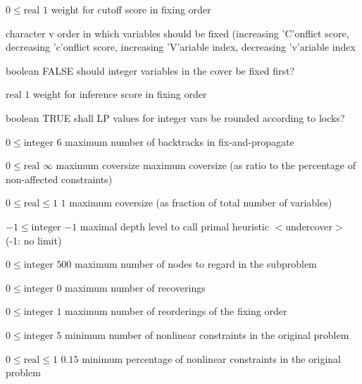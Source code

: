 %
{$0\leq\textrm{real}$}%
{$1$}%
{weight for cutoff score in fixing order}%
{}

%
{character}%
{v}%
{order in which variables should be fixed (increasing 'C'onflict score, decreasing 'c'onflict score, increasing 'V'ariable index, decreasing 'v'ariable index}%
{}

%
{boolean}%
{FALSE}%
{should integer variables in the cover be fixed first?}%
{}

%
{$\textrm{real}$}%
{$1$}%
{weight for inference score in fixing order}%
{}

%
{boolean}%
{TRUE}%
{shall LP values for integer vars be rounded according to locks?}%
{}

%
{$0\leq\textrm{integer}$}%
{$6$}%
{maximum number of backtracks in fix-and-propagate}%
{}

%
{$0\leq\textrm{real}$}%
{$\infty$}%
{maximum coversize maximum coversize (as ratio to the percentage of non-affected constraints)}%
{}

%
{$0\leq\textrm{real}\leq1$}%
{$1$}%
{maximum coversize (as fraction of total number of variables)}%
{}

%
{$-1\leq\textrm{integer}$}%
{$-1$}%
{maximal depth level to call primal heuristic $<$undercover$>$ (-1: no limit)}%
{}

%
{$0\leq\textrm{integer}$}%
{$500$}%
{maximum number of nodes to regard in the subproblem}%
{}

%
{$0\leq\textrm{integer}$}%
{$0$}%
{maximum number of recoverings}%
{}

%
{$0\leq\textrm{integer}$}%
{$1$}%
{maximum number of reorderings of the fixing order}%
{}

%
{$0\leq\textrm{integer}$}%
{$5$}%
{minimum number of nonlinear constraints in the original problem}%
{}

%
{$0\leq\textrm{real}\leq1$}%
{$0.15$}%
{minimum percentage of nonlinear constraints in the original problem}%
{}

